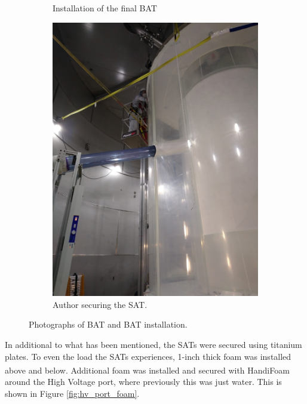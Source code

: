 \begin{figure}[!htbp]
\begin{subfigure}{.5\textwidth}
  \caption{Installation of the final BAT}
  \label{fig:BAT_installation}
  \end{subfigure}
  \begin{subfigure}{.5\textwidth}
  \centering
  \includegraphics[angle=-90, width=\linewidth]{Figures/Construction/SAT_titanium_plate.JPG}
  \caption{Author securing the SAT.}
  \label{fig:SAT_titanium_installation}
  \end{subfigure}
\caption{Photographs of BAT and BAT installation.}
\label{fig:sat_and_bat_installation}
\end{figure}

\par
In additional to what has been mentioned, the SATs were secured using titanium plates.
To even the load the SATs experiences, 1-inch thick foam was installed above and below.
Additional foam was installed and secured with HandiFoam\textsuperscript{\textregistered} around the High Voltage port, where previously this was just water.
This is shown in Figure \ref{fig:hv_port_foam}.

